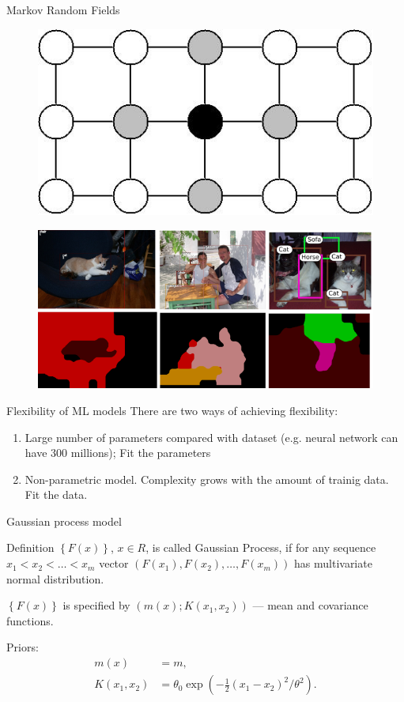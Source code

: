 \documentclass[12pt]{beamer}
\begin{document}
\begin{frame}{Markov Random Fields}
\begin{figure}
\includegraphics[scale=0.2]{MRF.jpg} 
\end{figure}
\begin{figure}
\includegraphics[scale=0.7]{MRF_example.png} 
\end{figure}
\end{frame}

\begin{frame}{Flexibility of ML models}
There are two ways of achieving flexibility:
\begin{enumerate}
    \item Large number of parameters compared with dataset (e.g. neural network can have 300 millions); Fit the parameters
    \item Non-parametric model. Complexity grows with the amount of trainig data. Fit the data.
\end{enumerate}
\end{frame}

\begin{frame}{Gaussian process model}
\begin{block}{Definition}
$\left\{F(x)\right\}$, $x\in R$, is called Gaussian Process, if for any sequence $x_1<x_2<\ldots<x_m$ vector $\left(F(x_1),F(x_2),\ldots,F(x_m)\right)$ has multivariate normal distribution.
\end{block}
$\left\{F(x)\right\}$ is specified by $(m(x);K(x_1,x_2))$ --- mean and covariance functions.

{\color{blue}Priors}:
\begin{align*}
m(x)&=m,\\
K(x_1,x_2)&=\theta_0 \exp{\left(-\frac{1}{2}(x_1-x_2)^2/\theta^2\right)}.
\end{align*}

\end{frame}
\end{document}
